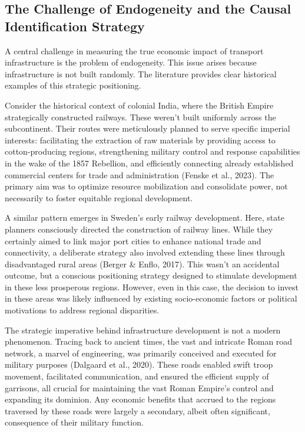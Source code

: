 \documentclass[12pt, a4paper]{article}
\begin{document}
\subsection{The Challenge of Endogeneity and the Causal Identification Strategy}
A central challenge in measuring the true economic impact of transport infrastructure is the problem of endogeneity. This issue arises because infrastructure is not built randomly. The literature provides clear historical examples of this strategic positioning.

Consider the historical context of colonial India, where the British Empire strategically constructed railways. These weren't built uniformly across the subcontinent. Their routes were meticulously planned to serve specific imperial interests: facilitating the extraction of raw materials by providing access to cotton-producing regions, strengthening military control and response capabilities in the wake of the 1857 Rebellion, and efficiently connecting already established commercial centers for trade and administration (Fenske et al., 2023). The primary aim was to optimize resource mobilization and consolidate power, not necessarily to foster equitable regional development.


A similar pattern emerges in Sweden's early railway development. Here, state planners consciously directed the construction of railway lines. While they certainly aimed to link major port cities to enhance national trade and connectivity, a deliberate strategy also involved extending these lines through disadvantaged rural areas (Berger \& Enflo, 2017). This wasn't an accidental outcome, but a conscious positioning strategy designed to stimulate development in these less prosperous regions. However, even in this case, the decision to invest in these areas was likely influenced by existing socio-economic factors or political motivations to address regional disparities.


The strategic imperative behind infrastructure development is not a modern phenomenon. Tracing back to ancient times, the vast and intricate Roman road network, a marvel of engineering, was primarily conceived and executed for military purposes (Dalgaard et al., 2020). These roads enabled swift troop movement, facilitated communication, and ensured the efficient supply of garrisons, all crucial for maintaining the vast Roman Empire's control and expanding its dominion. Any economic benefits that accrued to the regions traversed by these roads were largely a secondary, albeit often significant, consequence of their military function.
\end{document}
